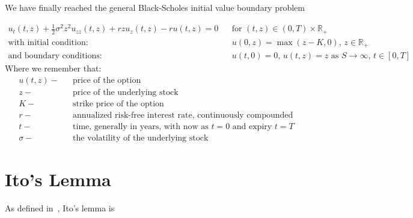 \documentclass[11pt]{article} %
\begin{document}
We have finally reached the general Black-Scholes initial value boundary problem

\begin{align}
    u_t(t,z) +\frac{1}{2}\sigma^2z^2u_{zz}(t,z) + rzu_z(t,z) - ru(t,z) = 0 &&
    \text{for $(t,z) \in (0,T) \times \mathbb{R}_+ $}\\
    \text{with initial condition: } && u(0,z) = \max{(z-K, 0)} \text{, } 
    z \in \mathbb{R}_+ \\
    \text{and boundary conditions: } && u(t, 0) = 0 \text{,  $u(t,z) = z$ as 
    $S \to \infty $,  $t \in [0,T]$}
\end{align}
Where we remember that: 
\begin{align}
    u(t,z) - && \text{price of the option}\\
    z - && \text{price of the underlying stock}\\
    K - && \text{strike price of the option}\\
    r - && \text{annualized risk-free interest rate, continuously compounded}\\
    t - && \text{time, generally in years, with now as $t=0$ and expiry $t=T$}\\
    \sigma - && \text{the volatility of the underlying stock}
\end{align}
\section{Ito's Lemma}
As defined in~\cite{itoprocess}, Ito's lemma is 
\end{document}
